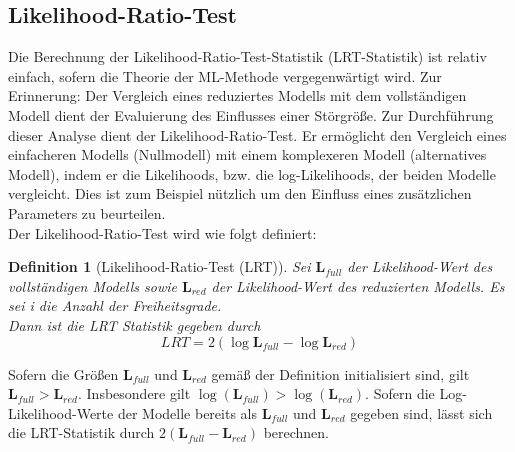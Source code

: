 \documentclass[%
thesis=student,%
coverpage=false,%
titlepage=false,%
headmarks=true, %
german,%
font=libertine, %
math=newpxtx, %
BCOR=5mm,%
coverBCOR=11mm%
]{tumbook}
\theoremstyle{break}
\newtheorem{definition}{Definition}[section]
\begin{document}
\subsection{Likelihood-Ratio-Test}
Die Berechnung der Likelihood-Ratio-Test-Statistik (LRT-Statistik) ist relativ einfach, sofern die Theorie der ML-Methode vergegenwärtigt wird. Zur Erinnerung: Der Vergleich eines reduziertes Modells mit dem vollständigen Modell dient der Evaluierung des Einflusses einer Störgröße. Zur Durchführung dieser Analyse dient der Likelihood-Ratio-Test. Er ermöglicht den Vergleich eines einfacheren Modells (Nullmodell) mit einem komplexeren Modell (alternatives Modell), indem er die Likelihoods, bzw. die log-Likelihoods, der beiden Modelle vergleicht. Dies ist zum Beispiel nützlich um den Einfluss eines zusätzlichen Parameters zu beurteilen.\\
Der Likelihood-Ratio-Test wird wie folgt definiert:\\
\begin{definition}[Likelihood-Ratio-Test (LRT)] 
	Sei $\mathbf{L}_{full}$ der Likelihood-Wert des vollständigen Modells sowie $\mathbf{L}_{red}$ der Likelihood-Wert des reduzierten Modells. Es sei i die Anzahl der Freiheitsgrade.\\
	Dann ist die LRT Statistik gegeben durch 
	$$ LRT = 2(\log \mathbf{L}_{full}- \log \mathbf{L}_{red}) $$ 
\end{definition} \noindent
Sofern die Größen $\mathbf{L}_{full}$ und $\mathbf{L}_{red}$ gemäß der Definition initialisiert sind, gilt $\mathbf{L}_{full} > \mathbf{L}_{red}$. Insbesondere gilt $\log(\mathbf{L}_{full}) > \log(\mathbf{L}_{red})$.
Sofern die Log-Likelihood-Werte der Modelle bereits als $\mathbf{L}_{full}$ und $\mathbf{L}_{red}$ gegeben sind, lässt sich die LRT-Statistik durch $2(\mathbf{L}_{full} - \mathbf{L}_{red})$ berechnen. \\
\\
\end{document}
